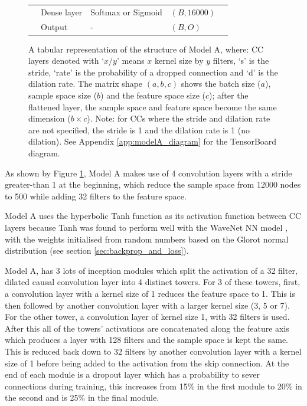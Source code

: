 \documentclass[12pt]{article}
\begin{document}
\begin{figure}[H]
\begin{scriptsize}
\begin{tabular}{l|l|l|l|l|l|l|l|l|}
                & \multicolumn{5}{|l|}{Dense layer}& Softmax or Sigmoid & $(B, 16000)$ &\\
                \cline{2-8}
                & \multicolumn{5}{|l|}{Output} & - & $(B, O)$ &\\
                \bottomrule
            \end{tabular}
        \end{scriptsize}
        \caption{\footnotesize{A tabular representation of the structure of Model A, where: CC layers denoted with `$x/y$' means $x$ kernel size by $y$ filters, `s' is the stride, `rate' is the probability of a dropped connection and `d' is the dilation rate. The matrix shape $(a, b, c)$ shows the batch size ($a$), sample space size ($b$) and the feature space size ($c$); after the flattened layer, the sample space and feature space become the same dimension ($b\times c$). Note: for CCs where the stride and dilation rate are not specified, the stride is 1 and the dilation rate is 1 (no dilation). See Appendix \ref{app:modelA_diagram} for the TensorBoard diagram.}}
        \label{fig:modelA_structure}
    \end{figure}
    
    As shown by Figure \ref{fig:modelA_structure}, Model A makes use of 4 convolution layers with a stride greater-than 1 at the beginning, which reduce the sample space from 12000 nodes to 500 while adding 32 filters to the feature space.\medskip
    
    Model A uses the hyperbolic Tanh function as its activation function between CC layers because Tanh was found to perform well with the WaveNet NN model \parencite{Oord2016}, with the weights initialised from random numbers based on the Glorot normal distribution (see section \ref{sec:backprop_and_loss}).\medskip
    
    Model A, has 3 lots of inception modules which split the activation of a 32 filter, dilated causal convolution layer into 4 distinct towers. For 3 of these towers, first, a convolution layer with a kernel size of 1 reduces the feature space to 1. This is then followed by another convolution layer with a larger kernel size (3, 5 or 7). For the other tower, a convolution layer of kernel size 1, with 32 filters is used. After this all of the towers' activations are concatenated along the feature axis which produces a layer with 128 filters and the sample space is kept the same. This is reduced back down to 32 filters by another convolution layer with a kernel size of 1 before being added to the activation from the skip connection. At the end of each module is a dropout layer which has a probability to sever connections during training, this increases from 15\% in the first module to 20\% in the second and is 25\% in the final module.\medskip
    
\end{document}
